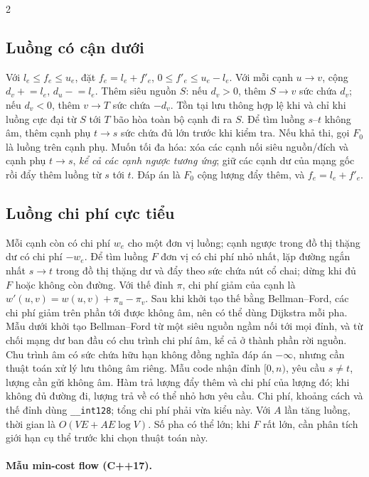 \begin{multicols}{2}
\subsection{Luồng có cận dưới}
Với $l_e\le f_e\le u_e$, đặt $f_e=l_e+f'_e$,
$0\le f'_e\le u_e-l_e$. Với mỗi cạnh $u\to v$, cộng
$d_v\mathrel{+}=l_e$, $d_u\mathrel{-}=l_e$.
Thêm siêu nguồn $S$: nếu $d_v>0$, thêm $S\to v$ sức chứa
$d_v$; nếu $d_v<0$, thêm $v\to T$ sức chứa $-d_v$.
Tồn tại lưu thông hợp lệ khi và chỉ khi luồng cực đại từ
$S$ tới $T$ bão hòa toàn bộ cạnh đi ra $S$.
Để tìm luồng $s$--$t$ không âm, thêm cạnh phụ $t\to s$ sức chứa
đủ lớn trước khi kiểm tra. Nếu khả thi, gọi $F_0$ là luồng trên
cạnh phụ. Muốn tối đa hóa: xóa các cạnh nối siêu nguồn/đích
và cạnh phụ $t\to s$, \emph{kể cả các cạnh ngược tương ứng};
giữ các cạnh dư của mạng gốc rồi đẩy thêm luồng từ $s$ tới $t$.
Đáp án là $F_0$ cộng lượng đẩy thêm, và $f_e=l_e+f'_e$.

\subsection{Luồng chi phí cực tiểu}
Mỗi cạnh còn có chi phí $w_e$ cho một đơn vị luồng; cạnh
ngược trong đồ thị thặng dư có chi phí $-w_e$.
Để tìm luồng $F$ đơn vị có chi phí nhỏ nhất, lặp đường ngắn
nhất $s\to t$ trong đồ thị thặng dư và đẩy theo sức chứa nút cổ
chai; dừng khi đủ $F$ hoặc không còn đường. Với thế đỉnh
$\pi$, chi phí giảm của cạnh là
$w'(u,v)=w(u,v)+\pi_u-\pi_v$. Sau khi khởi tạo thế bằng
Bellman--Ford, các chi phí giảm trên phần tới được không âm,
nên có thể dùng Dijkstra mỗi pha.
Mẫu dưới khởi tạo Bellman--Ford từ một siêu nguồn ngầm nối tới
mọi đỉnh, và từ chối mạng dư ban đầu có chu trình chi phí âm,
kể cả ở thành phần rời nguồn. Chu trình âm có sức chứa hữu hạn
không đồng nghĩa đáp án $-\infty$, nhưng cần thuật toán xử lý
lưu thông âm riêng. Mẫu code nhận đỉnh $[0,n)$, yêu cầu
$s\ne t$, lượng cần gửi không âm.
Hàm trả lượng đẩy thêm và chi phí của lượng đó; khi không đủ
đường đi, lượng trả về có thể nhỏ hơn yêu cầu.
Chi phí, khoảng cách và thế đỉnh dùng \texttt{\_\_int128};
tổng chi phí phải vừa kiểu này. Với $A$ lần tăng luồng,
thời gian là $O(VE+A E\log V)$.
Số pha có thể lớn; khi $F$ rất lớn, cần phân tích giới hạn
cụ thể trước khi chọn thuật toán này.

\paragraph{Mẫu min-cost flow (C++17).}
\end{multicols}
\endgroup
